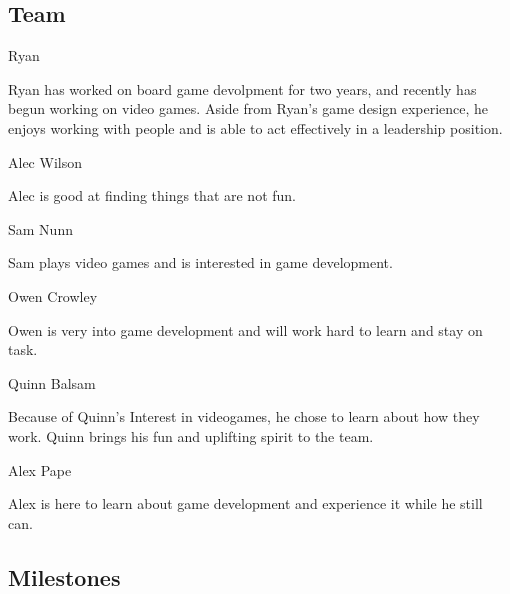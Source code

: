 \documentclass[11pt]{article}
\begin{document}
\subsection{{\color{blue}Team}}

{\large {\color{orange}Ryan}}

Ryan has worked on board game devolpment for two years, and recently has begun working on video games. Aside from Ryan's game design experience, he enjoys working with people and is able to act effectively in a leadership position.

{\large {\color{orange}Alec Wilson}}

Alec is good at finding things that are not fun.


{\large {\color{orange}Sam Nunn}}

Sam plays video games and is interested in game development.

{\large {\color{orange}Owen Crowley}}

Owen is very into game development and will work hard to learn and stay on task.

{\large {\color{orange}Quinn Balsam}}

Because of Quinn’s Interest in videogames, he chose to learn about how they work. Quinn brings his fun and uplifting spirit to the team. 

{\large {\color{orange}Alex Pape}}

Alex is here to learn about game development and experience it while he still can.

\subsection{{\color{blue}Milestones}}
\end{document}
